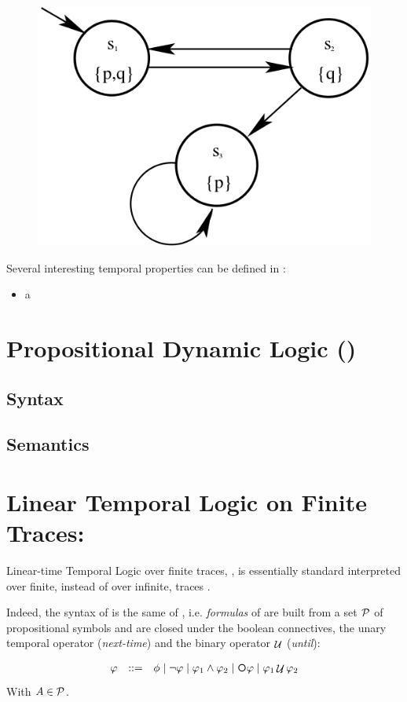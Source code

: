 \begin{figure}[h]
	  \centering
	\includegraphics[width=.5\linewidth]{images/KripkeStructureExample}
\end{figure}
Several interesting temporal properties can be defined in \LTL:
\begin{itemize}
	\item a
\end{itemize}
\section{Propositional Dynamic Logic (\PDL)}

\subsection{Syntax}
\subsection{Semantics}
	
\section{Linear Temporal Logic on Finite Traces: \LTLf}
Linear-time Temporal Logic over finite traces, \LTLf, is essentially standard 
\LTL \citep{Pnueli:1977:TLP:1382431.1382534} interpreted over finite, instead of over infinite, traces \citep{de2013linear}.

Indeed, the syntax of \LTLf is the same of \LTLf, i.e. \emph{formulas} of \LTLf are built from a set $\mathcal{P}$ of propositional symbols and are closed under the boolean connectives, the unary temporal operator \Next (\emph{next-time}) and the binary operator $\mathop{\mathcal{U}}$ (\emph{until}):

\[\begin{array}{rcl}
\varphi &::=& \phi \mid \lnot \varphi \mid \varphi_1\land \varphi_2 \mid \Next\varphi \mid \varphi_1 \Until \varphi_2
\end{array}
\]
With $A\in \mathcal{P}$.

